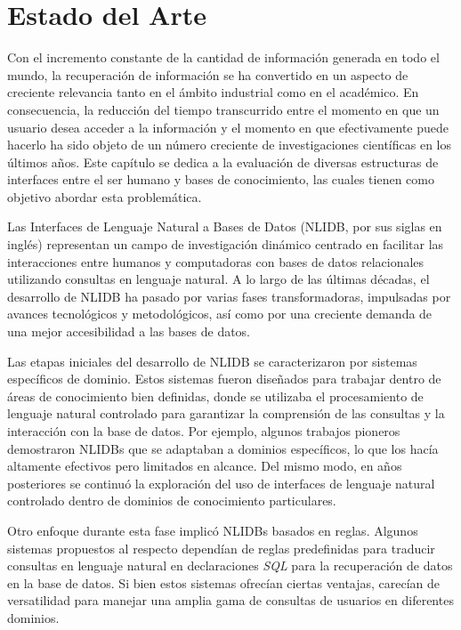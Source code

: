 \chapter{Estado del Arte}\label{chapter: sota}

Con el incremento constante de la cantidad de información generada en todo el mundo, la recuperación de información se ha convertido en un aspecto de creciente relevancia tanto en el ámbito industrial como en el académico. En consecuencia, la reducción del tiempo transcurrido entre el momento en que un usuario desea acceder a la información y el momento en que efectivamente puede hacerlo ha sido objeto de un número creciente de investigaciones científicas en los últimos años. Este capítulo se dedica a la evaluación de diversas estructuras de interfaces entre el ser humano y bases de conocimiento, las cuales tienen como objetivo abordar esta problemática.

Las Interfaces de Lenguaje Natural a Bases de Datos (NLIDB, por sus siglas en inglés) representan un campo de investigación dinámico centrado en facilitar las interacciones entre humanos y computadoras con bases de datos relacionales utilizando consultas en lenguaje natural. A lo largo de las últimas décadas, el desarrollo de NLIDB ha pasado por varias fases transformadoras, impulsadas por avances tecnológicos y metodológicos, así como por una creciente demanda de una mejor accesibilidad a las bases de datos.

Las etapas iniciales del desarrollo de NLIDB se caracterizaron por sistemas específicos de dominio. Estos sistemas fueron diseñados para trabajar dentro de áreas de conocimiento bien definidas, donde se utilizaba el procesamiento de lenguaje natural controlado para garantizar la comprensión de las consultas y la interacción con la base de datos. Por ejemplo, algunos trabajos pioneros \cite{popescuetal2003} \cite{popescuetal2004} demostraron NLIDBs que se adaptaban a dominios específicos, lo que los hacía altamente efectivos pero limitados en alcance. Del mismo modo, en años posteriores \cite{lietal2007} \cite{liandjagadish2014} se continuó la exploración del uso de interfaces de lenguaje natural controlado dentro de dominios de conocimiento particulares.

Otro enfoque durante esta fase implicó NLIDBs basados en reglas. Algunos sistemas propuestos al respecto \cite{straticaetal2005} dependían de reglas predefinidas para traducir consultas en lenguaje natural en declaraciones \textit{SQL} para la recuperación de datos en la base de datos. Si bien estos sistemas ofrecían ciertas ventajas, carecían de versatilidad para manejar una amplia gama de consultas de usuarios en diferentes dominios.

